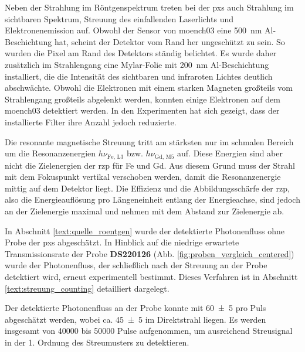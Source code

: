 \noindent
Neben der Strahlung im Röntgenspektrum treten bei der \gls{pxs} auch Strahlung im sichtbaren Spektrum, Streuung des einfallenden Laserlichts und Elektronenemission auf. Obwohl der Sensor von \gls{moench03} eine \SI{500}{\nano\meter} Al-Beschichtung hat, scheint der Detektor vom Rand her ungeschützt zu sein. So wurden die Pixel am Rand des Detektors ständig belichtet. Es wurde daher zusätzlich im Strahlengang eine Mylar-Folie mit \SI{200}{\nano\meter} Al-Beschichtung installiert, die die Intensität des sichtbaren und infraroten Lichtes deutlich abschwächte. Obwohl die Elektronen mit einem starken Magneten großteils vom Strahlengang großteils abgelenkt werden, konnten einige Elektronen auf dem \gls{moench03} detektiert werden. In den Experimenten hat sich gezeigt, dass der installierte Filter ihre Anzahl jedoch reduzierte.
%

\noindent
Die resonante magnetische Streuung tritt am stärksten nur im schmalen Bereich um die Resonanzenergien $h\nu_{\text{Fe, L3}}$ bzw. $h\nu_{\text{Gd, M5}}$ auf. Diese Energien sind aber nicht die Zielenergien der \gls{rzp} für Fe und Gd. Aus diesem Grund muss der Strahl mit dem Fokuspunkt vertikal verschoben werden, damit die Resonanzenergie mittig auf dem Detektor liegt. Die Effizienz und die Abbildungsschärfe der \gls{rzp}, also die Energieauflösung pro Längeneinheit entlang der Energieachse, sind jedoch an der Zielenergie maximal und nehmen mit dem Abstand zur Zielenergie ab.

\noindent
In Abschnitt \ref{text:quelle_roentgen} wurde der detektierte Photonenfluss ohne Probe der \gls{pxs} abgeschätzt. In Hinblick auf die niedrige erwartete Transmissionsrate der Probe \textbf{DS220126} (Abb. \ref{fig:proben_vergleich_centered}) wurde der Photonenfluss, der schließlich nach der Streuung an der Probe detektiert wird, erneut experimentell bestimmt. Dieses Verfahren ist in Abschnitt \ref{text:streuung_counting} detailliert dargelegt.

\noindent
Der detektierte Photonenfluss an der Probe konnte mit \SI{60(5)}{\photons} pro Puls abgeschätzt werden, wobei ca. \SI{45(5)}{\photons} im Direktstrahl liegen. Es werden insgesamt von \num{40000} bis \SI{50000}{\captures} Pulse aufgenommen, um ausreichend Streusignal in der 1. Ordnung des Streumusters zu detektieren.


